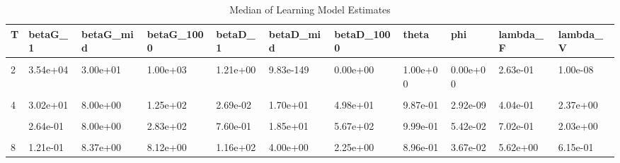 \begin{table}[!h]
\centering
\caption{Median of Learning Model Estimates}
\centering
\begin{tabular}[t]{lllllllllll}
\toprule
T & betaG\_1 & betaG\_mid & betaG\_1000 & betaD\_1 & betaD\_mid & betaD\_1000 & theta & phi & lambda\_F & lambda\_V\\
\midrule
\cellcolor{gray!10}{1} & \cellcolor{gray!10}{3.81e-04} & \cellcolor{gray!10}{6.00e+01} & \cellcolor{gray!10}{1.00e+03} & \cellcolor{gray!10}{7.19e-09} & \cellcolor{gray!10}{7.03e-09} & \cellcolor{gray!10}{4.92e-09} & \cellcolor{gray!10}{1.00e+00} & \cellcolor{gray!10}{8.88e-01} & \cellcolor{gray!10}{1.77e+01} & \cellcolor{gray!10}{6.18e+05}\\
2 & 3.54e+04 & 3.00e+01 & 1.00e+03 & 1.21e+00 & 9.83e-149 & 0.00e+00 & 1.00e+00 & 0.00e+00 & 2.63e-01 & 1.00e-08\\
\cellcolor{gray!10}{3} & \cellcolor{gray!10}{2.52e-02} & \cellcolor{gray!10}{5.06e+00} & \cellcolor{gray!10}{1.20e+02} & \cellcolor{gray!10}{2.11e-02} & \cellcolor{gray!10}{4.80e+01} & \cellcolor{gray!10}{8.35e+02} & \cellcolor{gray!10}{1.00e+00} & \cellcolor{gray!10}{7.72e-01} & \cellcolor{gray!10}{4.27e+00} & \cellcolor{gray!10}{4.69e+04}\\
4 & 3.02e+01 & 8.00e+00 & 1.25e+02 & 2.69e-02 & 1.70e+01 & 4.98e+01 & 9.87e-01 & 2.92e-09 & 4.04e-01 & 2.37e+00\\
\cellcolor{gray!10}{5} & \cellcolor{gray!10}{3.59e+00} & \cellcolor{gray!10}{8.00e+00} & \cellcolor{gray!10}{1.83e+01} & \cellcolor{gray!10}{1.44e-01} & \cellcolor{gray!10}{1.59e+01} & \cellcolor{gray!10}{3.25e+01} & \cellcolor{gray!10}{9.77e-01} & \cellcolor{gray!10}{3.05e-09} & \cellcolor{gray!10}{8.87e-01} & \cellcolor{gray!10}{4.73e-01}\\
\addlinespace
6 & 2.64e-01 & 8.00e+00 & 2.83e+02 & 7.60e-01 & 1.85e+01 & 5.67e+02 & 9.99e-01 & 5.42e-02 & 7.02e-01 & 2.03e+00\\
\cellcolor{gray!10}{7} & \cellcolor{gray!10}{1.40e+00} & \cellcolor{gray!10}{4.39e+00} & \cellcolor{gray!10}{4.01e+00} & \cellcolor{gray!10}{8.45e+01} & \cellcolor{gray!10}{4.00e+00} & \cellcolor{gray!10}{1.18e+00} & \cellcolor{gray!10}{7.72e-01} & \cellcolor{gray!10}{3.56e-03} & \cellcolor{gray!10}{4.52e+00} & \cellcolor{gray!10}{1.68e-02}\\
8 & 1.21e-01 & 8.37e+00 & 8.12e+00 & 1.16e+02 & 4.00e+00 & 2.25e+00 & 8.96e-01 & 3.67e-02 & 5.62e+00 & 6.15e-01\\
\bottomrule
\end{tabular}
\end{table}